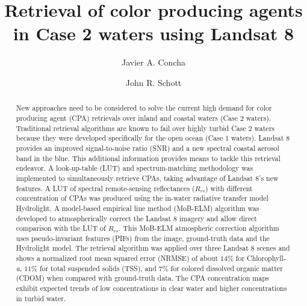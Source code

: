 \documentclass[onecolumn,3p,letterpaper,11pt]{elsarticle}
\begin{document}
\linenumbers

\begin{frontmatter}

\title{Retrieval of color producing agents in Case 2 waters using Landsat 8}


\author[mymainaddress]{Javier A. Concha}

\author[mymainaddress]{John R. Schott}
\address[mymainaddress]{Rochester Institute of Technology (RIT), NY 14623, USA}
\begin{abstract}

New approaches need to be considered to solve the current high demand for color producing agent (CPA) retrievals over inland and coastal waters (Case 2 waters). 
%
Traditional retrieval algorithms are known to fail over highly turbid Case 2 waters because they were developed specifically for the open ocean (Case 1 waters). 
%
Landsat 8 provides an improved signal-to-noise ratio (SNR) and a new spectral coastal aerosol band in the blue. 
%
This additional information provides means to tackle this retrieval endeavor. 
A look-up-table (LUT) and spectrum-matching methodology was implemented to simultaneously retrieve CPAs, taking advantage of Landsat 8's new features. 
%
A LUT of spectral remote-sensing reflectances ($R_{rs}$) with different concentration of CPAs was produced using the in-water radiative transfer model Hydrolight. 
%
A model-based empirical line method (MoB-ELM) algorithm was developed to atmospherically correct the Landsat 8 imagery and allow direct comparison with the LUT of $R_{rs}$. 
%
This MoB-ELM atmospheric correction algorithm uses pseudo-invariant features (PIFs) from the image, ground-truth data and the Hydrolight model.
The retrieval algorithm was applied over three Landsat 8 scenes and shows a normalized root mean squared error (NRMSE) of about $14\%$ for Chlorophyll-{\it a}, $11\%$ for total suspended solids (TSS), and $7\%$ for colored dissolved organic matter (CDOM) when compared with ground-truth data. The CPA concentration maps exhibit expected trends of low concentrations in clear water and higher concentrations in turbid water.


\end{abstract}
\end{frontmatter}
\end{document}
